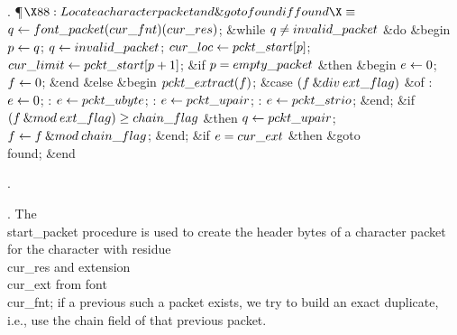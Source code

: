 . \P$\X88:Locate a character packet and \&{goto} \\{found} if found\X\S$\6
$\|q\K\\{font\_packet}(\\{cur\_fnt})(\\{cur\_res})$;\6
\&{while} $\|q\I\\{invalid\_packet}$ \1\&{do}\6
\&{begin} $\|p\K\|q$;\5
$\|q\K\\{invalid\_packet}$;\5
$\\{cur\_loc}\K\\{pckt\_start}[\|p]$;\5
$\\{cur\_limit}\K\\{pckt\_start}[\|p+1]$;\6
\&{if} $\|p=\\{empty\_packet}$ \1\&{then}\6
\&{begin} $\|e\K0$;\5
$\|f\K0$;\6
\&{end}\6
\4\&{else} \&{begin} $\\{pckt\_extract}(\|f)$;\6
\&{case} $(\|f\mathbin{\&{div}}\\{ext\_flag})$ \1\&{of}\6
: $\|e\K0$;\6
: $\|e\K\\{pckt\_ubyte}$;\6
: $\|e\K\\{pckt\_upair}$;\6
: $\|e\K\\{pckt\_strio}$;\2\6
\&{end};\6
\&{if} $(\|f\mathbin{\&{mod}}\\{ext\_flag})\G\\{chain\_flag}$ \1\&{then}\5
$\|q\K\\{pckt\_upair}$;\2\6
$\|f\K\|f\mathbin{\&{mod}}\\{chain\_flag}$;\6
\&{end};\2\6
\&{if} $\|e=\\{cur\_ext}$ \1\&{then}\5
\&{goto} \\{found};\2\6
\&{end}\2\par
{}.\fi

. The \\{start\_packet} procedure is used to create the header bytes of a
character packet for the character with residue~\\{cur\_res} and
extension~\\{cur\_ext} from font~\\{cur\_fnt}; if a previous such a packet
exists, we try to build an exact duplicate, i.e., use the chain field of
that previous packet.

